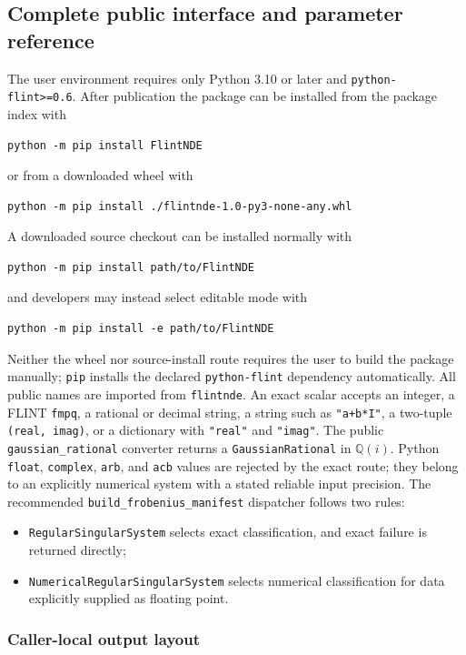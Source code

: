 \documentclass[11pt]{article}
\begin{document}
\subsection{Complete public interface and parameter reference}
\label{sec:user-interface}
\label{subsec:public-interface}

The user environment requires only Python 3.10 or later and
\texttt{python-flint>=0.6}.  After publication the package can be installed from the package
index with
\begin{verbatim}
python -m pip install FlintNDE
\end{verbatim}
or from a downloaded wheel with
\begin{verbatim}
python -m pip install ./flintnde-1.0-py3-none-any.whl
\end{verbatim}
A downloaded source checkout can be installed normally with
\begin{verbatim}
python -m pip install path/to/FlintNDE
\end{verbatim}
and developers may instead select editable mode with
\begin{verbatim}
python -m pip install -e path/to/FlintNDE
\end{verbatim}
Neither the wheel nor source-install route requires the user to build the package manually;
\texttt{pip} installs the declared \texttt{python-flint} dependency automatically.
All public names are imported from \texttt{flintnde}.  An exact scalar accepts an integer,
a FLINT \texttt{fmpq}, a rational or decimal string, a string such as \texttt{"a+b*I"}, a
two-tuple \texttt{(real, imag)}, or a dictionary with \texttt{"real"} and \texttt{"imag"}.
The public \texttt{gaussian\_rational} converter returns a \texttt{GaussianRational} in
$\mathbb Q(i)$.  Python \texttt{float}, \texttt{complex}, \texttt{arb}, and \texttt{acb}
values are rejected by the exact route; they belong to an explicitly numerical system with
a stated reliable input precision.  The recommended
\texttt{build\_frobenius\_manifest} dispatcher follows two rules:
\begin{itemize}
  \item \texttt{RegularSingularSystem} selects exact classification, and exact failure is
  returned directly;
  \item \texttt{NumericalRegularSingularSystem} selects numerical classification for data
  explicitly supplied as floating point.
\end{itemize}

\subsubsection{Caller-local output layout}
\end{document}
